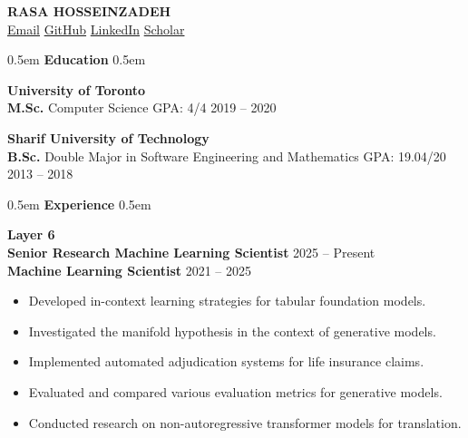\documentclass[11pt,a4paper]{article}
\newcommand{\cvsection}[1]{%
    \vspace{10pt}
    \noindent\hfill\kern0.5em
    {\Huge \textbf{\textcolor{maincolor}{#1}}}%
    \kern0.5em\hfill\vspace{8pt}
}
\begin{document}
\RaggedRight %

\begin{center}
    {\Huge \textbf{\MakeUppercase{Rasa Hosseinzadeh}}} \\[5pt]
    \href{mailto:rasa.hosseinzadeh@gmail.com}{\textcolor{maincolor}{\faEnvelope}\hspace{0.5em} Email} \hspace{1.5em}
    \href{https://github.com/rasaHosseinzadeh}{\textcolor{maincolor}{\faGithub}\hspace{0.5em} GitHub} \hspace{1.5em}
    \href{https://linkedin.com/in/rasa-hosseinzadeh-6204a6208}{\textcolor{maincolor}{\faLinkedin}\hspace{0.5em} LinkedIn} \hspace{1.5em}
    \href{https://scholar.google.com/citations?user=1Evd7mYAAAAJ}{\textcolor{maincolor}{\faGraduationCap}\hspace{0.5em} Scholar}
\end{center}
\vspace{15pt}

\cvsection{Education}

{\Large \textbf{\textcolor{maincolor}{University of Toronto}}} \\
\textbf{M.Sc.} \hspace{1.4em} Computer Science \hspace{18.0em} GPA: 4/4 \hfill 2019 -- 2020 \\
\vspace{8pt}

{\Large \textbf{\textcolor{maincolor}{Sharif University of Technology}}} \\
\textbf{B.Sc.} \hspace{1.7em} Double Major in Software Engineering and Mathematics \hfill GPA: 19.04/20 \hfill 2013 -- 2018 \\
\vspace{15pt}

\cvsection{Experience}


{\Large \textbf{\textcolor{maincolor}{Layer 6}}} \\
\textbf{Senior Research Machine Learning Scientist} \hfill 2025 -- Present \\
\textbf{Machine Learning Scientist} \hfill 2021 -- 2025
\begin{itemize}[noitemsep, topsep=4pt, leftmargin=1.5em, label=\textcolor{maincolorlight}{$\circ$}]
    \item Developed in-context learning strategies for tabular foundation models.
    \item Investigated the manifold hypothesis in the context of generative models.
    \item Implemented automated adjudication systems for life insurance claims.
    \item Evaluated and compared various evaluation metrics for generative models.
    \item Conducted research on non-autoregressive transformer models for translation.
\end{itemize}
\vspace{10pt}
\end{document}
